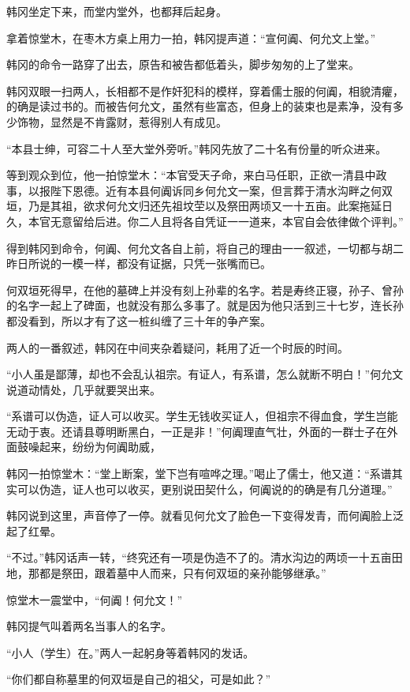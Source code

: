 韩冈坐定下来，而堂内堂外，也都拜后起身。

拿着惊堂木，在枣木方桌上用力一拍，韩冈提声道：“宣何阗、何允文上堂。”

韩冈的命令一路穿了出去，原告和被告都低着头，脚步匆匆的上了堂来。

韩冈双眼一扫两人，长相都不是作奸犯科的模样，穿着儒士服的何阗，相貌清癯，的确是读过书的。而被告何允文，虽然有些富态，但身上的装束也是素净，没有多少饰物，显然是不肯露财，惹得别人有成见。

“本县士绅，可容二十人至大堂外旁听。”韩冈先放了二十名有份量的听众进来。

等到观众到位，他一拍惊堂木：“本官受天子命，来白马任职，正欲一清县中政事，以报陛下恩德。近有本县何阗诉同乡何允文一案，但言葬于清水沟畔之何双垣，乃是其祖，欲求何允文归还先祖坟茔以及祭田两顷又一十五亩。此案拖延日久，本官无意留给后进。你二人且将各自凭证一一道来，本官自会依律做个评判。”

得到韩冈到命令，何阗、何允文各自上前，将自己的理由一一叙述，一切都与胡二昨日所说的一模一样，都没有证据，只凭一张嘴而已。

何双垣死得早，在他的墓碑上并没有刻上孙辈的名字。若是寿终正寝，孙子、曾孙的名字一起上了碑面，也就没有那么多事了。就是因为他只活到三十七岁，连长孙都没看到，所以才有了这一桩纠缠了三十年的争产案。

两人的一番叙述，韩冈在中间夹杂着疑问，耗用了近一个时辰的时间。

“小人虽是鄙薄，却也不会乱认祖宗。有证人，有系谱，怎么就断不明白！”何允文说道动情处，几乎就要哭出来。

“系谱可以伪造，证人可以收买。学生无钱收买证人，但祖宗不得血食，学生岂能无动于衷。还请县尊明断黑白，一正是非！”何阗理直气壮，外面的一群士子在外面鼓噪起来，纷纷为何阗助威，

韩冈一拍惊堂木：“堂上断案，堂下岂有喧哗之理。”喝止了儒士，他又道：“系谱其实可以伪造，证人也可以收买，更别说田契什么，何阗说的的确是有几分道理。”

韩冈说到这里，声音停了一停。就看见何允文了脸色一下变得发青，而何阗脸上泛起了红晕。

“不过。”韩冈话声一转，“终究还有一项是伪造不了的。清水沟边的两顷一十五亩田地，那都是祭田，跟着墓中人而来，只有何双垣的亲孙能够继承。”

惊堂木一震堂中，“何阗！何允文！”

韩冈提气叫着两名当事人的名字。

“小人（学生）在。”两人一起躬身等着韩冈的发话。

“你们都自称墓里的何双垣是自己的祖父，可是如此？”


